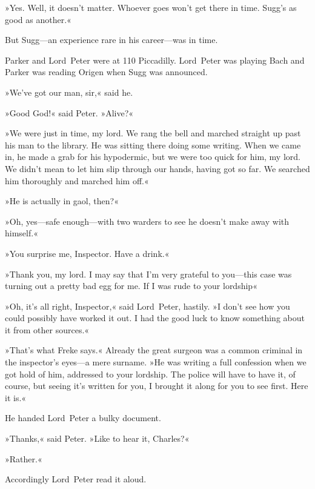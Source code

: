 »Yes. Well, it doesn't matter. Whoever goes won't get there in time. Sugg's as good as another.«

But Sugg—an experience rare in his career—was in time.

Parker and Lord~Peter were at 110 Piccadilly. Lord~Peter was playing Bach and Parker was reading Origen when Sugg was announced.

»We've got our man, sir,« said he.

»Good God!« said Peter. »Alive?«

»We were just in time, my lord. We rang the bell and marched straight up past his man to the library. He was sitting there doing some writing. When we came in, he made a grab for his hypodermic, but we were too quick for him, my lord. We didn't mean to let him slip through our hands, having got so far. We searched him thoroughly and marched him off.«

»He is actually in gaol, then?«

»Oh, yes—safe enough—with two warders to see he doesn't make away with himself.«

»You surprise me, Inspector. Have a drink.«

»Thank you, my lord. I may say that I'm very grateful to you—this case was turning out a pretty bad egg for me. If I was rude to your lordship\longdash«

»Oh, it's all right, Inspector,« said Lord~Peter, hastily. »I don't see how you could possibly have worked it out. I had the good luck to know something about it from other sources.«

»That's what Freke says.« Already the great surgeon was a common criminal in the inspector's eyes—a mere surname. »He was writing a full confession when we got hold of him, addressed to your lordship. The police will have to have it, of course, but seeing it's written for you, I brought it along for you to see first. Here it is.«

He handed Lord~Peter a bulky document.

»Thanks,« said Peter. »Like to hear it, Charles?«

»Rather.«

Accordingly Lord~Peter read it aloud.
